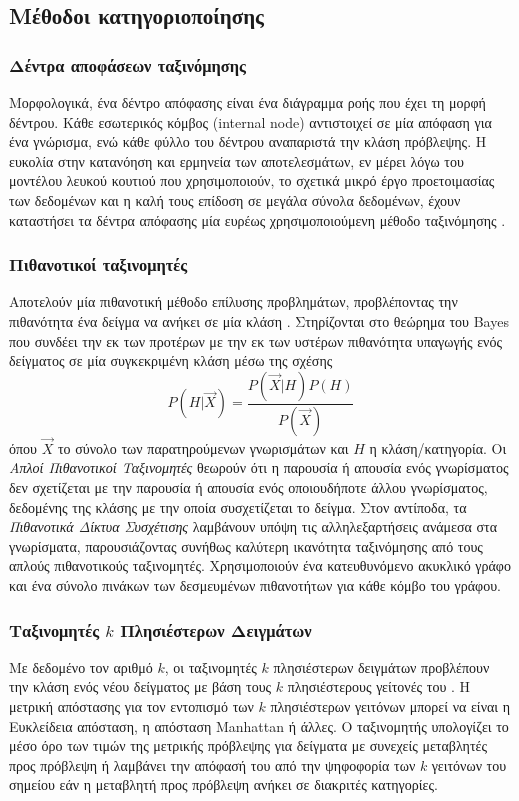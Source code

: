 \subsection{Μέθοδοι κατηγοριοποίησης}

\subsubsection{Δέντρα αποφάσεων ταξινόμησης}
Μορφολογικά, ένα δέντρο απόφασης είναι ένα διάγραμμα ροής που έχει τη μορφή δέντρου. Κάθε εσωτερικός κόμβος (internal node) αντιστοιχεί σε μία απόφαση για ένα γνώρισμα, ενώ κάθε φύλλο του δέντρου αναπαριστά την κλάση πρόβλεψης. Η ευκολία στην κατανόηση και ερμηνεία των αποτελεσμάτων, εν μέρει λόγω του μοντέλου λευκού κουτιού που χρησιμοποιούν, το σχετικά μικρό έργο προετοιμασίας των δεδομένων και η καλή τους επίδοση σε μεγάλα σύνολα δεδομένων, έχουν καταστήσει τα δέντρα απόφασης μία ευρέως χρησιμοποιούμενη μέθοδο ταξινόμησης \cite{murthy}.

\subsubsection{Πιθανοτικοί ταξινομητές}
Αποτελούν μία πιθανοτική μέθοδο επίλυσης προβλημάτων, προβλέποντας την πιθανότητα ένα δείγμα να ανήκει σε μία κλάση \cite{hanson1991bayesian}. Στηρίζονται στο θεώρημα του Bayes που συνδέει την εκ των προτέρων με την εκ των υστέρων πιθανότητα υπαγωγής ενός δείγματος σε μία συγκεκριμένη κλάση μέσω της σχέσης 
\begin{equation}
 P(H|\vec{X})=\frac{P(\vec{X}|H)P(H)}{P(\vec{X})}
\end{equation}
όπου $\vec{X}$ το σύνολο των παρατηρούμενων γνωρισμάτων και $H$ η κλάση/κατηγορία.
Οι \emph{Απλοί Πιθανοτικοί Ταξινομητές} θεωρούν ότι η παρουσία ή απουσία ενός γνωρίσματος δεν σχετίζεται με την παρουσία ή απουσία ενός οποιουδήποτε άλλου γνωρίσματος, δεδομένης της κλάσης με την οποία συσχετίζεται το δείγμα. Στον αντίποδα, τα \emph{Πιθανοτικά Δίκτυα Συσχέτισης} λαμβάνουν υπόψη τις αλληλεξαρτήσεις ανάμεσα στα γνωρίσματα, παρουσιάζοντας συνήθως καλύτερη ικανότητα ταξινόμησης από τους απλούς πιθανοτικούς ταξινομητές. Χρησιμοποιούν ένα κατευθυνόμενο ακυκλικό γράφο και ένα σύνολο πινάκων των δεσμευμένων πιθανοτήτων για κάθε κόμβο του γράφου.

\subsubsection{Ταξινομητές $k$ Πλησιέστερων Δειγμάτων}
Με δεδομένο τον αριθμό $k$, οι ταξινομητές $k$ πλησιέστερων δειγμάτων προβλέπουν την κλάση ενός νέου δείγματος με βάση τους $k$ πλησιέστερους γείτονές του \cite{aha1991instance}. Η μετρική απόστασης για τον εντοπισμό των $k$ πλησιέστερων γειτόνων μπορεί να είναι η Ευκλείδεια απόσταση, η απόσταση Manhattan ή άλλες. Ο ταξινομητής υπολογίζει το μέσο όρο των τιμών της μετρικής πρόβλεψης για δείγματα με συνεχείς μεταβλητές προς πρόβλεψη ή λαμβάνει την απόφασή του από την ψηφοφορία των $k$ γειτόνων του σημείου εάν η μεταβλητή προς πρόβλεψη ανήκει σε διακριτές κατηγορίες.

